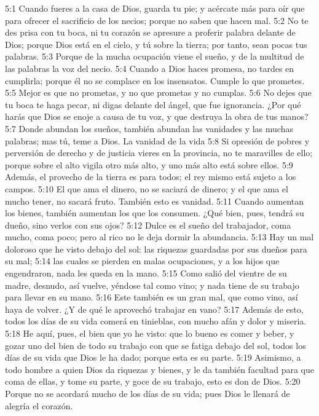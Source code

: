 5:1 Cuando fueres a la casa de Dios, guarda tu pie; y acércate más para oír que para ofrecer el sacrificio de los necios; porque no saben que hacen mal.  
5:2 No te des prisa con tu boca, ni tu corazón se apresure a proferir palabra delante de Dios; porque Dios está en el cielo, y tú sobre la tierra; por tanto, sean pocas tus palabras.  
5:3 Porque de la mucha ocupación viene el sueño, y de la multitud de las palabras la voz del necio.  
5:4 Cuando a Dios haces promesa, no tardes en cumplirla; porque él no se complace en los insensatos. Cumple lo que prometes. 
5:5 Mejor es que no prometas, y no que prometas y no cumplas.  
5:6 No dejes que tu boca te haga pecar, ni digas delante del ángel, que fue ignorancia. ¿Por qué harás que Dios se enoje a causa de tu voz, y que destruya la obra de tus manos?  
5:7 Donde abundan los sueños, también abundan las vanidades y las muchas palabras; mas tú, teme a Dios.  
La vanidad de la vida  
5:8 Si opresión de pobres y perversión de derecho y de justicia vieres en la provincia, no te maravilles de ello; porque sobre el alto vigila otro más alto, y uno más alto está sobre ellos.  
5:9 Además, el provecho de la tierra es para todos; el rey mismo está sujeto a los campos.  
5:10 El que ama el dinero, no se saciará de dinero; y el que ama el mucho tener, no sacará fruto. También esto es vanidad.  
5:11 Cuando aumentan los bienes, también aumentan los que los consumen. ¿Qué bien, pues, tendrá su dueño, sino verlos con sus ojos?  
5:12 Dulce es el sueño del trabajador, coma mucho, coma poco; pero al rico no le deja dormir la abundancia.  
5:13 Hay un mal doloroso que he visto debajo del sol: las riquezas guardadas por sus dueños para su mal;  
5:14 las cuales se pierden en malas ocupaciones, y a los hijos que engendraron, nada les queda en la mano.  
5:15 Como salió del vientre de su madre, desnudo, así vuelve, yéndose tal como vino; y nada tiene de su trabajo para llevar en su mano.  
5:16 Este también es un gran mal, que como vino, así haya de volver. ¿Y de qué le aprovechó trabajar en vano?  
5:17 Además de esto, todos los días de su vida comerá en tinieblas, con mucho afán y dolor y miseria.  
5:18 He aquí, pues, el bien que yo he visto: que lo bueno es comer y beber, y gozar uno del bien de todo su trabajo con que se fatiga debajo del sol, todos los días de su vida que Dios le ha dado; porque esta es su parte.  
5:19 Asimismo, a todo hombre a quien Dios da riquezas y bienes, y le da también facultad para que coma de ellas, y tome su parte, y goce de su trabajo, esto es don de Dios.  
5:20 Porque no se acordará mucho de los días de su vida; pues Dios le llenará de alegría el corazón.  

